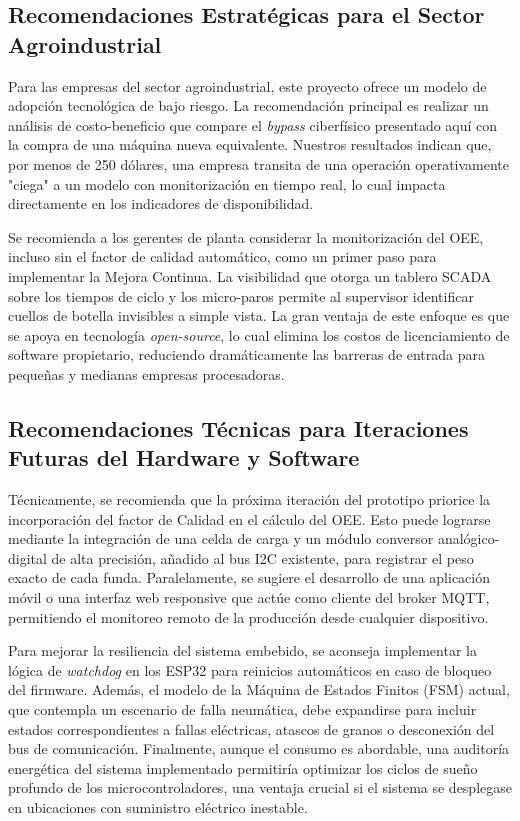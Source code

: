 \subsection{Recomendaciones Estratégicas para el Sector Agroindustrial}
Para las empresas del sector agroindustrial, este proyecto ofrece un modelo de adopción tecnológica de bajo riesgo. La recomendación principal es realizar un análisis de costo-beneficio que compare el \textit{bypass} ciberfísico presentado aquí con la compra de una máquina nueva equivalente. Nuestros resultados indican que, por menos de 250 dólares, una empresa transita de una operación operativamente "ciega" a un modelo con monitorización en tiempo real, lo cual impacta directamente en los indicadores de disponibilidad.

Se recomienda a los gerentes de planta considerar la monitorización del OEE, incluso sin el factor de calidad automático, como un primer paso para implementar la Mejora Continua. La visibilidad que otorga un tablero SCADA sobre los tiempos de ciclo y los micro-paros permite al supervisor identificar cuellos de botella invisibles a simple vista. La gran ventaja de este enfoque es que se apoya en tecnología \textit{open-source}, lo cual elimina los costos de licenciamiento de software propietario, reduciendo dramáticamente las barreras de entrada para pequeñas y medianas empresas procesadoras.

\subsection{Recomendaciones Técnicas para Iteraciones Futuras del Hardware y Software}
Técnicamente, se recomienda que la próxima iteración del prototipo priorice la incorporación del factor de Calidad en el cálculo del OEE. Esto puede lograrse mediante la integración de una celda de carga y un módulo conversor analógico-digital de alta precisión, añadido al bus I2C existente, para registrar el peso exacto de cada funda. Paralelamente, se sugiere el desarrollo de una aplicación móvil o una interfaz web responsive que actúe como cliente del broker MQTT, permitiendo el monitoreo remoto de la producción desde cualquier dispositivo.

Para mejorar la resiliencia del sistema embebido, se aconseja implementar la lógica de \textit{watchdog} en los ESP32 para reinicios automáticos en caso de bloqueo del firmware. Además, el modelo de la Máquina de Estados Finitos (FSM) actual, que contempla un escenario de falla neumática, debe expandirse para incluir estados correspondientes a fallas eléctricas, atascos de granos o desconexión del bus de comunicación. Finalmente, aunque el consumo es abordable, una auditoría energética del sistema implementado permitiría optimizar los ciclos de sueño profundo de los microcontroladores, una ventaja crucial si el sistema se desplegase en ubicaciones con suministro eléctrico inestable.

